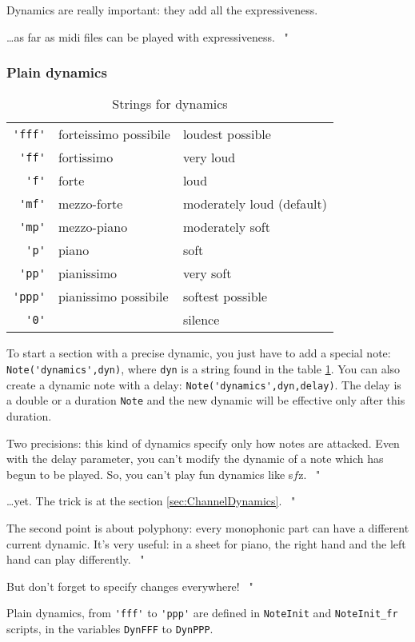 \documentclass{article}
\newcommand\sfz{s$\!f\!$z\xspace}
\newenvironment{meenv}{ \par \noindent \makebox[6em][r]{ \textcolor{mecolor}{Me}: " --~}}{~"}
\newenvironment{myselfenv}{ \par \noindent \makebox[6em][r]{ \textcolor{myselfcolor}{Myself}: " --~}}{~"}
\newcommand{ \me }[1]{%
\begin{meenv}%
	#1%
\end{meenv} }
\newcommand{ \myself }[1]{%
\begin{myselfenv}%
	#1%
\end{myselfenv} }
\begin{document}
Dynamics are really important: they add all the expressiveness.
\me{\dots as far as midi files can be played with expressiveness.}

\subsubsection{Plain dynamics}
\label{sec:PlainDynamics}

\begin{table}
	\centering
	\begin{tabular}{rll}
		\lstinline!'fff'! & forteissimo possibile & loudest possible \\
		\lstinline!'ff'! & fortissimo & very loud \\
		\lstinline!'f'! & forte & loud \\
		\lstinline!'mf'! & mezzo-forte & moderately loud (default) \\
		\lstinline!'mp'! & mezzo-piano & moderately soft \\
		\lstinline!'p'! & piano & soft \\
		\lstinline!'pp'! & pianissimo & very soft \\
		\lstinline!'ppp'! & pianissimo possibile & softest possible \\
		\lstinline!'0'! & & silence \\
	\end{tabular}
	\caption{Strings for dynamics}
	\label{tab:dynamics}
\end{table}

To start a section with a precise dynamic, you just have to add a special note: \lstinline!Note('dynamics',dyn)!, where \lstinline!dyn! is a string found in the table \ref{tab:dynamics}. You can also create a dynamic note with a delay: \lstinline!Note('dynamics',dyn,delay)!. The delay is a double or a duration \lstinline!Note! and the new dynamic will be effective only after this duration.

\myself{Two precisions: this kind of dynamics specify only how notes are attacked. Even with the delay parameter, you can't modify the dynamic of a note which has begun to be played. So, you can't play fun dynamics like \sfz.}
\me{\dots yet. The trick is at the section \ref{sec:ChannelDynamics}.}
\myself{The second point is about polyphony: every monophonic part can have a different current dynamic. It's very useful: in a sheet for piano, the right hand and the left hand can play differently.}
\me{But don't forget to specify changes everywhere!}

Plain dynamics, from \lstinline!'fff'! to \lstinline!'ppp'! are defined in \lstinline!NoteInit! and \lstinline!NoteInit_fr! scripts, in the variables \lstinline!DynFFF! to \lstinline!DynPPP!.
\end{document}
